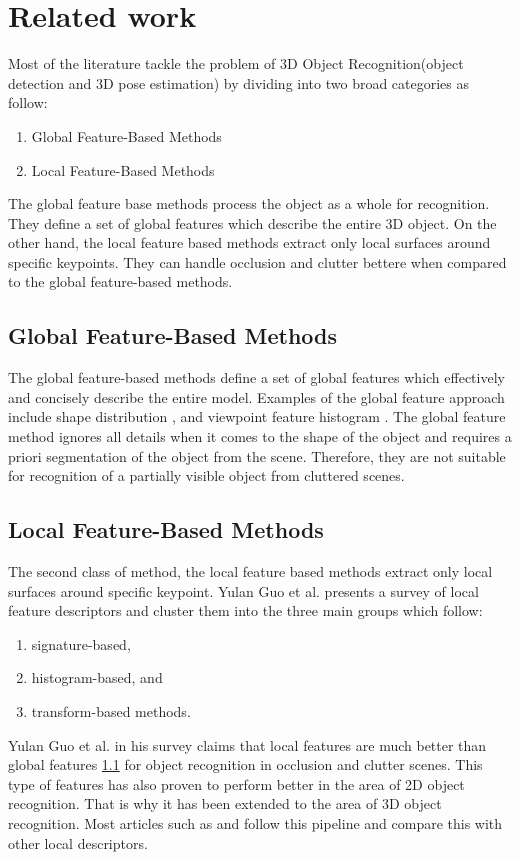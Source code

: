 
\chapter{Related work}
\label{chap:relwork}

Most of the literature tackle the problem of 3D Object Recognition(object detection and 3D pose estimation) by dividing into two broad categories as follow:
\begin{enumerate}
\item Global Feature-Based Methods
\item Local Feature-Based Methods
\end{enumerate}

The global feature base methods process the object as a whole for recognition. They define a set of global features which describe the entire 3D object.
On the other hand, the local feature based methods extract only local surfaces around specific keypoints. They can handle occlusion and clutter bettere when compared to the global feature-based methods.


\section{Global Feature-Based Methods} \label{global}

The global feature-based methods define a set of global features which effectively and concisely describe the entire model. Examples of the global feature approach include shape distribution \cite{shapedist}, and viewpoint feature histogram \cite{vfh}.
The global feature method ignores all details when it comes to the shape of the object and requires a priori segmentation of the object from the scene. 
Therefore, they are not suitable for recognition of a partially visible object from cluttered scenes. 

\section{Local Feature-Based Methods}

The second class of method, the local feature based methods extract only local surfaces around specific keypoint. Yulan Guo et al. \cite{survey} presents a survey of local feature descriptors and cluster them into the three main groups which follow:
\begin{enumerate}
\item signature-based,
\item histogram-based, and
\item transform-based methods.
\end{enumerate}

Yulan Guo et al. \cite{survey} in his survey claims that local features are much better than global features \ref{global} for object recognition in occlusion and clutter scenes. 
This type of features has also proven to perform better in the area of 2D object recognition. That is why it has been extended to the area of 3D object recognition. Most articles such as \cite{algFpfh} and \cite{repMatching} follow this pipeline and compare this with other local descriptors.

